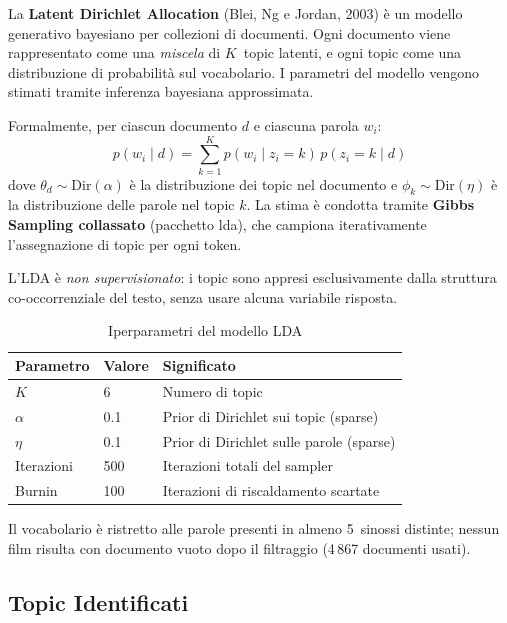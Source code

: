 \documentclass[12pt, a4paper]{article}
\newcommand{\pkg}[1]{\textsf{#1}}
\begin{document}
\begin{defbox}
La \textbf{Latent Dirichlet Allocation} (Blei, Ng e Jordan, 2003)
è un modello generativo bayesiano per collezioni di documenti.
Ogni documento viene rappresentato come una \emph{miscela} di
$K$~topic latenti, e ogni topic come una distribuzione di
probabilità sul vocabolario. I parametri del modello vengono
stimati tramite inferenza bayesiana approssimata.

Formalmente, per ciascun documento $d$ e ciascuna parola $w_i$:
\[
  p(w_i \mid d) = \sum_{k=1}^{K} p(w_i \mid z_i = k)\, p(z_i = k \mid d)
\]
dove $\theta_d \sim \mathrm{Dir}(\alpha)$ è la distribuzione dei
topic nel documento e $\phi_k \sim \mathrm{Dir}(\eta)$ è la
distribuzione delle parole nel topic $k$.
La stima è condotta tramite \textbf{Gibbs Sampling collassato}
(pacchetto \pkg{lda}), che campiona iterativamente l'assegnazione
di topic per ogni token.

L'LDA è \emph{non supervisionato}: i topic sono appresi
esclusivamente dalla struttura co-occorrenziale del testo,
senza usare alcuna variabile risposta.
\end{defbox}

\begin{table}[H]
\centering
\caption{Iperparametri del modello LDA}
\smallskip
\begin{tabular}{@{}lll@{}}
\toprule
\textbf{Parametro} & \textbf{Valore} & \textbf{Significato} \\
\midrule
$K$          & 6   & Numero di topic \\
$\alpha$     & 0.1 & Prior di Dirichlet sui topic (sparse) \\
$\eta$       & 0.1 & Prior di Dirichlet sulle parole (sparse) \\
Iterazioni   & 500 & Iterazioni totali del sampler \\
Burnin       & 100 & Iterazioni di riscaldamento scartate \\
\bottomrule
\end{tabular}
\end{table}

Il vocabolario è ristretto alle parole presenti in almeno
5~sinossi distinte; nessun film risulta con documento vuoto
dopo il filtraggio (4\,867 documenti usati).

\subsection{Topic Identificati}
\end{document}
